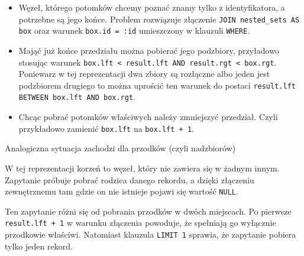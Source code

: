 \begin{itemize}
    \item 
	Węzeł, którego potomków chcemy poznać znamy tylko z identyfikatora, a potrzebne są jego końce.
        Problem rozwiązuje złączenie \verb|JOIN nested_sets AS box| oraz warunek \verb|box.id = :id| umieszczony w klauzuli \verb|WHERE|.
    \item 
        Mająć już końce przedziału można pobierać jego podzbiory,
        przyładowo stosując warunek
        \texttt{box.lft < result.lft AND result.rgt < box.rgt}.
        Poniewarz w tej reprezentacji dwa zbiory są rozłączne albo jeden jest podzbiorem drugiego to można uprościć ten warunek do postaci
        \texttt{result.lft BETWEEN box.lft AND box.rgt}.
    \item
        Chcąc pobrać potomków właściwych należy zmniejszyć przedział.
        Czyli przykładowo zamienić \verb|box.lft| na \verb|box.lft + 1|.
\end{itemize}

Analogiczna sytuacja zachodzi dla przodków (czyli nadzbiorów)


W tej reprezentacji korzeń to węzeł, który nie zawiera się w żadnym innym.
Zapytanie próbuje pobrać rodzica danego rekordu, a dzięki złączeniu zewnętrznemu tam gdzie on nie istnieje pojawi się wartość \texttt{NULL}.




Ten zapytanie różni się od pobrania przodków w dwóch miejscach.
Po pierwsze \texttt{result.lft + 1} w warunku złączenia powoduje, że spełniają go wyłącznie przodkowie właściwi.
Natomiast klauzula \texttt{LIMIT 1} sprawia, że zapytanie pobiera tylko jeden rekord.




